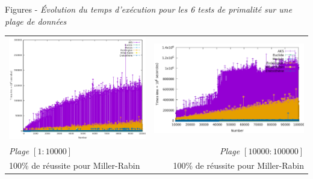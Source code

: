 		\begin{frame}
		\color{blue} Figures - \color{black}\textit{Évolution du temps d'exécution pour les 6 tests de primalité sur une plage de données}
		
		\footnotesize\begin{longtable}{l r}		
	\hspace{-2em} 
 		\includegraphics[scale=0.3]{RANGE.png}  & \includegraphics[scale=0.3]{RANGE2.png}\\
		 \textit{Plage $[1:10 000]$} & \textit{Plage $[10 000:100 000]$} \\
		 100\% de réussite pour Miller-Rabin &  100\% de réussite pour Miller-Rabin\\
	\end{longtable}
		\end{frame}


